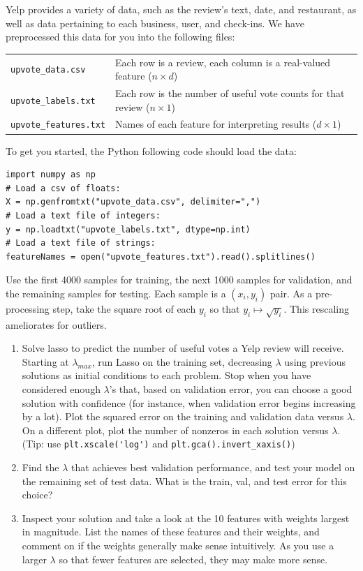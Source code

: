 \documentclass{article}
\newcommand{\1}{\mathbf{1}}
\begin{document}
Yelp provides a variety of data, such as the review's text, date, and restaurant, 
as well as data pertaining to each business, user, and check-ins.  We have preprocessed this data for you into the following files:

\begin{center}
\begin{tabular}{l l}
\texttt{upvote\_data.csv} & Each row is a review, each column is a real-valued feature ($ n\times d$)  \\
\texttt{upvote\_labels.txt} &  Each row is the number of useful vote counts for that review ($n \times 1$)\\
\texttt{upvote\_features.txt} & Names of each feature for interpreting results ($d\times 1$)
\end{tabular}
\end{center}

To get you started, the Python following code should load the data:

\begin{verbatim}
import numpy as np
# Load a csv of floats:
X = np.genfromtxt("upvote_data.csv", delimiter=",")
# Load a text file of integers:
y = np.loadtxt("upvote_labels.txt", dtype=np.int)
# Load a text file of strings:
featureNames = open("upvote_features.txt").read().splitlines()
\end{verbatim}

Use the first 4000 samples for training, the next 1000 samples for validation, and the remaining samples for testing.
Each sample is a $(x_i,y_i)$ pair. As a pre-processing step, take the square root of each $y_i$ so that $y_i \mapsto \sqrt{y_i}$. This rescaling ameliorates for outliers.
\begin{enumerate}
  \item Solve lasso to predict the number of useful votes a Yelp review will receive.  
  Starting at $\lambda_{max}$, run Lasso on the training set, decreasing $\lambda$ using
  previous solutions as initial conditions to each problem. Stop when you have
  considered enough $\lambda$'s that, based on validation error, you can
  choose a good solution with confidence (for instance, when validation
  error begins increasing by a lot).
  Plot the squared error on the training and validation data versus $\lambda$.
  On a different plot, plot the number of nonzeros in each solution versus $\lambda$.
   (Tip: use \verb|plt.xscale('log')| and \verb|plt.gca().invert_xaxis()|)\\
  \item Find the $\lambda$ that achieves best validation
  performance, and test your model on the remaining set of test data.  What is the train, val, and test error for this choice?
  \item Inspect your solution and take a look at the 10 features with weights largest in magnitude.
  List the names of these features and their weights, and comment on if the weights generally make sense intuitively. As you use a larger $\lambda$ so that fewer features are selected, they may make more sense.
\end{enumerate}  
\end{document}
